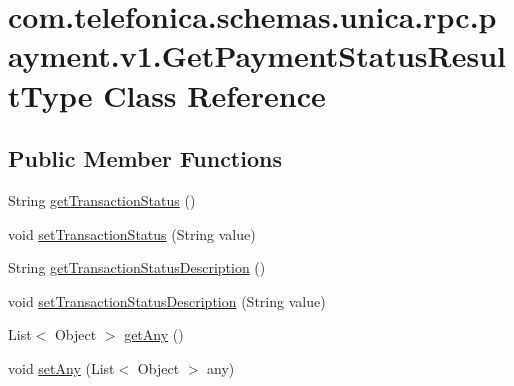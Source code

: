 \hypertarget{classcom_1_1telefonica_1_1schemas_1_1unica_1_1rpc_1_1payment_1_1v1_1_1GetPaymentStatusResultType}{
\section{com.telefonica.schemas.unica.rpc.payment.v1.GetPaymentStatusResultType Class Reference}
\label{classcom_1_1telefonica_1_1schemas_1_1unica_1_1rpc_1_1payment_1_1v1_1_1GetPaymentStatusResultType}
}
\subsection*{Public Member Functions}
\begin{DoxyCompactItemize}
\item 
String \hyperlink{classcom_1_1telefonica_1_1schemas_1_1unica_1_1rpc_1_1payment_1_1v1_1_1GetPaymentStatusResultType_afda277e403779f055078404dcca97d23}{getTransactionStatus} ()
\item 
void \hyperlink{classcom_1_1telefonica_1_1schemas_1_1unica_1_1rpc_1_1payment_1_1v1_1_1GetPaymentStatusResultType_ad6645998df452cd5f64a166522baef48}{setTransactionStatus} (String value)
\item 
String \hyperlink{classcom_1_1telefonica_1_1schemas_1_1unica_1_1rpc_1_1payment_1_1v1_1_1GetPaymentStatusResultType_aa8fcc62bddbfbe1e34c8bdae828041eb}{getTransactionStatusDescription} ()
\item 
void \hyperlink{classcom_1_1telefonica_1_1schemas_1_1unica_1_1rpc_1_1payment_1_1v1_1_1GetPaymentStatusResultType_a12b76ba1409d03cf0bd0e86f55a04e65}{setTransactionStatusDescription} (String value)
\item 
List$<$ Object $>$ \hyperlink{classcom_1_1telefonica_1_1schemas_1_1unica_1_1rpc_1_1payment_1_1v1_1_1GetPaymentStatusResultType_aa53ec14fd8278dc6bfd68ddfe54cd19b}{getAny} ()
\item 
void \hyperlink{classcom_1_1telefonica_1_1schemas_1_1unica_1_1rpc_1_1payment_1_1v1_1_1GetPaymentStatusResultType_a7a8c367ee803d26115e9c1b09f2aaac7}{setAny} (List$<$ Object $>$ any)
\end{DoxyCompactItemize}
